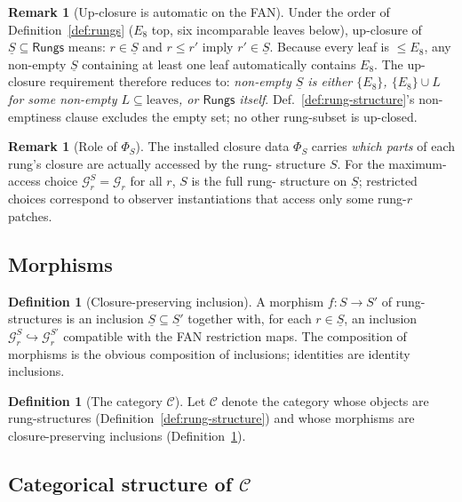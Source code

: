 \documentclass[11pt, a4paper]{amsart}
\theoremstyle{definition}
\newtheorem{definition}[theorem]{Definition}
\newtheorem{remark}[theorem]{Remark}
\newcommand{\Rungs}{\mathsf{Rungs}}
\newcommand{\catC}{\mathcal{C}}
\newcommand{\Gcal}{\mathcal{G}}
\begin{document}
\begin{remark}[Up-closure is automatic on the FAN]
\label{rmk:up-closed}
Under the order of Definition~\ref{def:rungs} ($E_8$ top, six
incomparable leaves below), up-closure of
$\underline{S} \subseteq \Rungs$ means: $r \in \underline{S}$
and $r \leq r'$ imply $r' \in \underline{S}$. Because every
leaf is $\leq E_8$, any non-empty $\underline{S}$ containing
at least one leaf automatically contains $E_8$. The up-closure
requirement therefore reduces to: \emph{non-empty
$\underline{S}$ is either $\{E_8\}$, $\{E_8\} \cup L$ for some
non-empty $L \subseteq \text{leaves}$, or $\Rungs$ itself}.
Def.~\ref{def:rung-structure}'s non-emptiness clause excludes
the empty set; no other rung-subset is up-closed.
\end{remark}

\begin{remark}[Role of $\Phi_S$]
\label{rmk:phi-data}
The installed closure data $\Phi_S$ carries \emph{which parts}
of each rung's closure are actually accessed by the rung-
structure $S$. For the maximum-access choice
$\Gcal_r^S = \Gcal_r$ for all $r$, $S$ is the full rung-
structure on $\underline{S}$; restricted choices correspond to
observer instantiations that access only some rung-$r$ patches.
\end{remark}

\subsection{Morphisms}

\begin{definition}[Closure-preserving inclusion]
\label{def:morphism}
A morphism $f \colon S \to S'$ of rung-structures is an inclusion
$\underline{S} \subseteq \underline{S'}$ together with, for each
$r \in \underline{S}$, an inclusion $\Gcal_r^S \hookrightarrow
\Gcal_r^{S'}$ compatible with the FAN restriction maps. The
composition of morphisms is the obvious composition of
inclusions; identities are identity inclusions.
\end{definition}

\begin{definition}[The category $\catC$]
\label{def:catC}
Let $\catC$ denote the category whose objects are rung-structures
(Definition~\ref{def:rung-structure}) and whose morphisms are
closure-preserving inclusions (Definition~\ref{def:morphism}).
\end{definition}

\subsection{Categorical structure of $\catC$}
\end{document}
